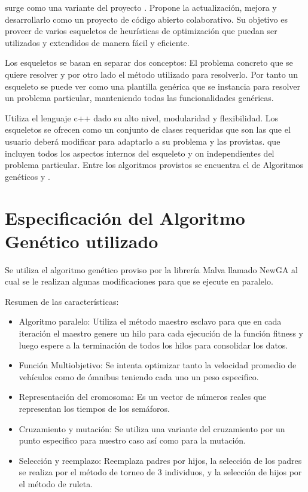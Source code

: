 \citep{Malva} surge como una variante del proyecto \citep{Mallba}. Propone la actualización, mejora y desarrollarlo como un proyecto de código abierto colaborativo.  Su objetivo es proveer de varios esqueletos de  heurísticas de optimización que puedan ser utilizados y extendidos de manera fácil y eficiente.

Los esqueletos se basan en separar dos conceptos: El problema concreto que se quiere resolver y por otro lado el método utilizado para resolverlo. Por tanto un esqueleto se puede ver como una plantilla genérica que se instancia para resolver un problema particular, manteniendo todas las funcionalidades genéricas.

Utiliza el lenguaje c++ dado su alto nivel, modularidad y flexibilidad. Los esqueletos se ofrecen como un conjunto de clases requeridas que son las que el usuario deberá modificar para adaptarlo a su problema y las provistas. que incluyen todos los aspectos internos del esqueleto y on independientes del problema particular. Entre los algoritmos provistos se encuentra el de Algoritmos genéticos y \citep{CHC}.


\newpage

\section{Especificación del Algoritmo Genético utilizado}
Se utiliza el algoritmo genético proviso por la librería  Malva  llamado NewGA al cual se le realizan algunas modificaciones para que se ejecute en paralelo.


Resumen de las características:
\begin{itemize}

\item Algoritmo paralelo: Utiliza el método maestro esclavo para que en cada iteración el maestro genere un hilo para cada ejecución  de la función fitness y luego espere a la terminación de todos los hilos para consolidar los datos. 
\item Función Multiobjetivo: Se intenta optimizar tanto la velocidad promedio de vehículos como de ómnibus teniendo cada uno un peso especifico.
\item Representación del cromosoma: Es un vector de números reales que representan los tiempos de los semáforos.
\item Cruzamiento y mutación: Se utiliza una variante del cruzamiento por un punto especifico para nuestro caso así como para la mutación.
\item Selección y reemplazo: Reemplaza padres por hijos, la selección de los padres se realiza por el método de torneo de 3 individuos, y la selección de hijos por el método de ruleta.

\end{itemize}

